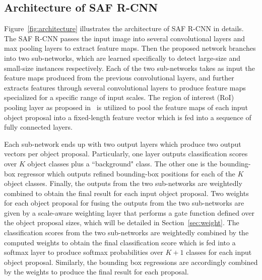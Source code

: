\documentclass[journal]{IEEEtran}
\begin{document}
\subsection{Architecture of SAF R-CNN}
Figure~\ref{fig:architecture} illustrates the architecture of SAF R-CNN in details. The SAF R-CNN passes the input image into several convolutional layers and max pooling layers to extract feature maps. Then the proposed network branches into two sub-networks, which are learned specifically to detect large-size and small-size instances respectively. Each of the two sub-networks takes as input the feature maps produced from the previous convolutional layers, and further extracts features through several convolutional layers to produce feature maps specialized for a specific range of input scales. The region of interest (RoI) pooling layer as proposed in~\cite{girshick2015fast} is utilized to pool the feature maps of each input object proposal into a fixed-length feature vector which is fed into a sequence of fully connected layers.

Each sub-network ends up with two output layers which produce two output vectors per object proposal. Particularly, one layer outputs classification scores over $K$ object classes plus a ``background" class. The other one is the bounding-box regressor which outputs refined bounding-box positions for each of the $K$ object classes. Finally, the outputs from the two sub-networks are weightedly combined to obtain the final result for each input object proposal. Two weights for each object proposal for fusing the outputs from the two sub-networks are given by a scale-aware weighting layer that performs a gate function defined over the object proposal sizes, which will be detailed in Section~\ref{sec:weight}. The classification scores from the two sub-networks are weightedly combined by the computed weights to obtain the final classification score which is fed into a softmax layer to produce softmax probabilities over $K+1$ classes for each input object proposal. Similarly, the bounding box regressions are accordingly combined by the weights to produce the final result for each proposal.
\end{document}
